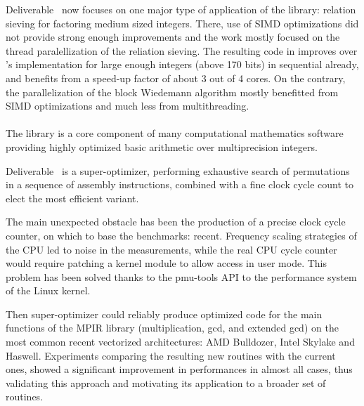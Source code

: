 \documentclass{deliverablereport}
\begin{document}
  Deliverable~ now focuses on one major type of
  application of the library: relation sieving for factoring medium sized
  integers. There, use of SIMD optimizations did not provide strong enough
  improvements and the work mostly focused on the thread paralellization of the
  reliation sieving. The resulting code in \FLINT improves over \Pari's
  implementation for large enough integers (above 170 bits) in sequential already, and benefits
  from a speed-up factor of about 3 out of 4 cores. On the contrary, the
  parallelization of the block Wiedemann algorithm mostly benefitted from SIMD
  optimizations and much less from multithreading.

  \paragraph{}

  The \MPIR library is  a core component of many computational mathematics
  software providing highly optimized  basic arithmetic over multiprecision
  integers.
  
  Deliverable~ is a super-optimizer, performing
  exhaustive search of permutations in a sequence of assembly instructions,
  combined with a fine clock cycle count to elect the most efficient variant.

  The main unexpected obstacle has been the production of a precise clock cycle
  counter, on which to base the benchmarks: recent. Frequency scaling strategies
  of the CPU led to noise in the  measurements, while the real CPU cycle counter
  would require patching a kernel module to allow access in user mode.
  This problem has been solved thanks to the pmu-tools API to the  performance system of the
  Linux kernel.

  Then super-optimizer could reliably produce optimized code for
  the main functions of the MPIR library (multiplication, gcd, and extended gcd)
  on the most common recent vectorized architectures: AMD Bulldozer, Intel
  Skylake and Haswell. Experiments comparing the resulting new routines with the
  current ones, showed a significant improvement in performances in almost all
  cases, thus validating this approach and motivating its application to a
  broader set of routines.

  \paragraph{}
\end{document}
